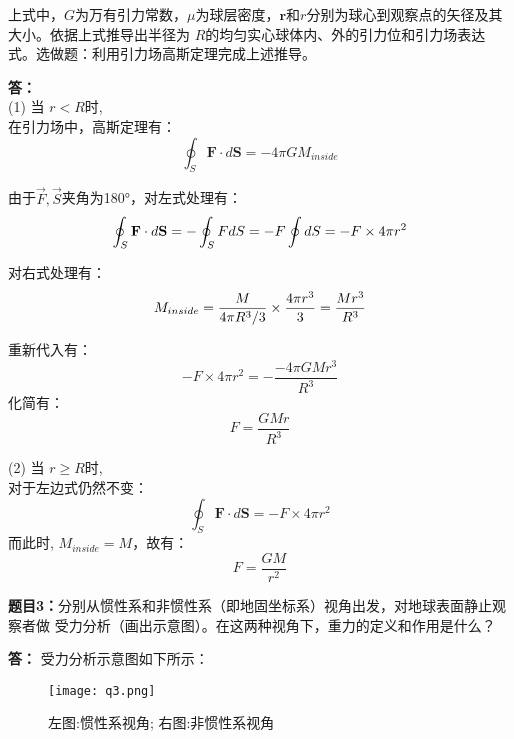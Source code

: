 \documentclass[12pt,a4paper]{article}
\begin{document}
\noindent
上式中，$G$为万有引力常数，$\mu$为球层密度，$\mathbf{r}$和$r$分别为球心到观察点的矢径及其大小。依据上式推导出半径为
$R$的均匀实心球体内、外的引力位和引力场表达式。选做题：利用引力场高斯定理完成上述推导。


\vspace{5pt}
\noindent
{\bf 答：}
\noindent \\
(1) 当 $r < R$时, \\
在引力场中，高斯定理有：
\begin{equation}
    \oint_{S}\mathbf{F}\cdot d\mathbf{S}=-4\pi GM_{inside}
\end{equation}

\noindent
由于$\vec{F}, \vec{S}$夹角为180°，对左式处理有：
\begin{equation}
    \oint_{S} \mathbf{F} \cdot d\mathbf{S} = - \oint_{S} F dS \\
    = - F \oint d S
    = - F \times 4 \pi r^2
\end{equation}

\noindent
对右式处理有：
\begin{equation}
    M_{inside} = \frac{M}{4 \pi R^3 / 3} \times \frac{4 \pi r^3}{3} \\
    = \frac{Mr^3}{R^3}
\end{equation}

\noindent
重新代入有：
\begin{equation}
    - F \times 4 \pi r^2 = - \frac{-4\pi G M r^3}{R^3}
\end{equation}
化简有：
\begin{equation}
    F = \frac{GM r}{R^3}
\end{equation}

\noindent
(2) 当 $r \geq R$时, \\
对于左边式仍然不变：
\begin{equation}
    \oint_S \mathbf{F} \cdot d \mathbf{S} = - F \times 4 \pi r^2
\end{equation}
而此时, $M_{inside} = M$，故有：
\begin{equation}
    F = \frac{GM}{r^2}
\end{equation}


\vspace{10pt}
\noindent
{\bf 题目3：}分别从惯性系和非惯性系（即地固坐标系）视角出发，对地球表面静止观察者做
受力分析（画出示意图）。在这两种视角下，重力的定义和作用是什么？


\vspace{5pt}
\noindent
{\bf 答：}
受力分析示意图如下所示：
\begin{figure}[H] %
    \centering %
    \texttt{[image: q3.png]} %
    \caption{左图:惯性系视角; 右图:非惯性系视角} %
    \label{Fig.main2} %
\end{figure}
\end{document}
